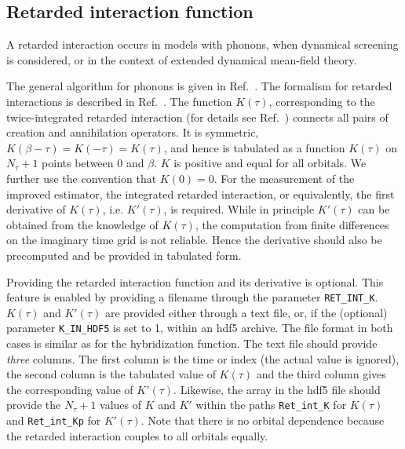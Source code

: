 \documentclass[aps,prb,floatfix,superscriptaddress,twocolumn,notitlepage]{revtex4-1}
\begin{document}
\subsection{Retarded interaction function}
\label{k_ret_int}
A retarded interaction occurs in models with phonons, when dynamical screening is considered, or in the context of extended dynamical mean-field theory.

The general algorithm for phonons is given in Ref.~. The formalism for retarded interactions is described in Ref.~. The function $K(\tau)$, corresponding to the twice-integrated retarded interaction (for details see Ref.~) connects all pairs of creation and annihilation operators. It is symmetric, $K(\beta-\tau)=K(-\tau)=K(\tau)$, and hence is tabulated as a function $K(\tau)$ on $N_{\tau}+1$ points between $0$ and $\beta$. $K$ is positive and equal for all orbitals. We further use the convention that $K(0)=0$. For the measurement of the improved estimator, the integrated retarded interaction, or equivalently, the first derivative of $K(\tau)$, i.e. $K'(\tau)$, is required. While in principle $K'(\tau)$ can be obtained from the knowledge of $K(\tau)$, the computation from finite differences on the imaginary time grid is not reliable. Hence the derivative should also be precomputed and be provided in tabulated form.

Providing the retarded interaction function and its derivative is optional. This feature is enabled by providing a filename through the parameter \verb#RET_INT_K#.
$K(\tau)$ and $K'(\tau)$ are provided either through a text file, or, if the (optional) parameter \verb#K_IN_HDF5# is set to 1, within an hdf5 archive.
The file format in both cases is similar as for the hybridization function. The text file should provide \emph{three} columns. The first column is the time or index (the actual value is ignored), the second column is the tabulated value of $K(\tau)$ and the third column gives the corresponding value of $K'(\tau)$.
Likewise, the array in the hdf5 file should provide the $N_{\tau}+1$ values of $K$ and $K'$ within the paths \verb#Ret_int_K# for $K(\tau)$ and \verb#Ret_int_Kp# for $K'(\tau)$.
Note that there is no orbital dependence because the retarded interaction couples to all orbitals equally.
\end{document}

